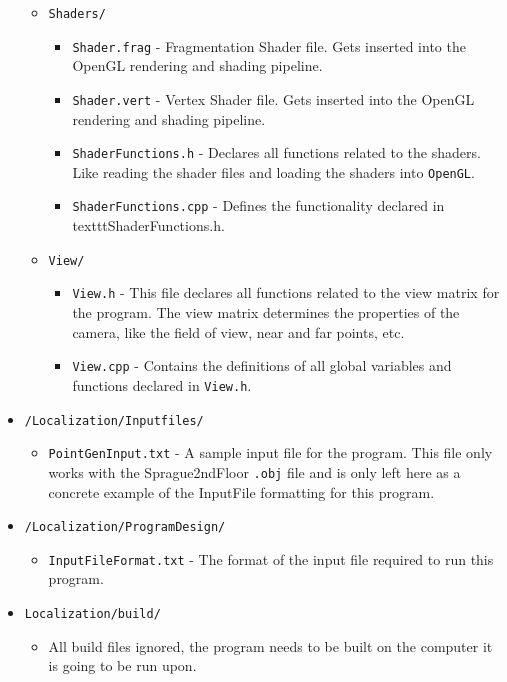 \documentclass[a4paper,11pt]{article}
\begin{document}
\begin{itemize}
\begin{itemize}
            \item \texttt{Shaders/}
                \begin{itemize}
                \item \texttt{Shader.frag} - Fragmentation Shader file. Gets inserted into the OpenGL rendering and shading pipeline. 
                \item \texttt{Shader.vert} - Vertex Shader file. Gets inserted into the OpenGL rendering and shading pipeline.
                \item \texttt{ShaderFunctions.h} - Declares all functions related to the shaders. Like reading the shader files and loading the shaders into \texttt{OpenGL}.
                \item \texttt{ShaderFunctions.cpp} - Defines the functionality declared in texttt{ShaderFunctions.h}.
                \end{itemize}
            \item \texttt{View/}
                \begin{itemize}
                \item \texttt{View.h} - This file declares all functions related to the view matrix for the program. The view matrix determines the properties of the camera, like the field of view, near and far points, etc.
                \item \texttt{View.cpp} - Contains the definitions of all global variables and functions declared in \texttt{View.h}. 
                \end{itemize}
            \end{itemize}%
        \item \texttt{/Localization/Inputfiles/}
	    \begin{itemize} 
            \item \texttt{PointGenInput.txt} - A sample input file for the program. This file only works with the Sprague2ndFloor \texttt{.obj} file and is only left here as a concrete example of the InputFile formatting for this program.
            \end{itemize}
        \item \texttt{/Localization/ProgramDesign/}
            \begin{itemize}
            \item \texttt{InputFileFormat.txt} - The format of the input file required to run this program.
            \end{itemize}
        \item \texttt{Localization/build/}
	    \begin{itemize}
	    \item All build files ignored, the program needs to be built on the computer it is going to be run upon.
	    \end{itemize}
        \end{itemize} %
        \newpage
\end{document}
